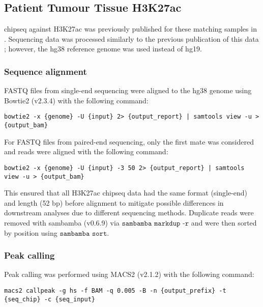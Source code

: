 \subsection{Patient Tumour Tissue H3K27ac }

\gls{chipseq} against H3K27ac was previously published for these matching samples in \cite{kronTMPRSS2ERGFusion2017}.
Sequencing data was processed similarly to the previous publication of this data \cite{kronTMPRSS2ERGFusion2017}; however, the hg38 reference genome was used instead of hg19.

\subsubsection{Sequence alignment}

FASTQ files from single-end sequencing were aligned to the hg38 genome using Bowtie2 (v2.3.4) with the following command:

\begin{lstlisting}[basicstyle=\ttfamily]
bowtie2 -x {genome} -U {input} 2> {output_report} | samtools view -u > {output_bam}
\end{lstlisting}

For FASTQ files from paired-end sequencing, only the first mate was considered and reads were aligned with the following command:

\begin{lstlisting}[basicstyle=\ttfamily]
bowtie2 -x {genome} -U {input} -3 50 2> {output_report} | samtools view -u > {output_bam}
\end{lstlisting}

This ensured that all H3K27ac \gls{chipseq} data had the same format (single-end) and length (52 bp) before alignment to mitigate possible differences in downstream analyses due to different sequencing methods.
Duplicate reads were removed with sambamba (v0.6.9) via $\texttt{sambamba markdup -r}$ and were then sorted by position using $\texttt{sambamba sort}$.

\subsubsection{Peak calling}

Peak calling was performed using MACS2 (v2.1.2) \cite{zhangModelbasedAnalysisChIPSeq2008} with the following command:

\begin{lstlisting}[basicstyle=\ttfamily]
macs2 callpeak -g hs -f BAM -q 0.005 -B -n {output_prefix} -t {seq_chip} -c {seq_input}\end{lstlisting}

